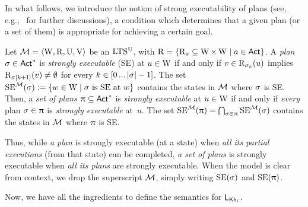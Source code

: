 \medskip

In what follows, we introduce the notion of strong executability of plans (see, e.g.,~\cite{Wang15lori,AFSVQ23report} for further discussions), a condition which determines that a given plan (or a set of them) is appropriate for achieving a certain goal.

\medskip


\begin{definition}\label{def:plans-exec}
Let $\mathcal{M}=\langle \operatorname{W}, \operatorname{R}, \operatorname{U}, \operatorname{V} \rangle$ be an $\textup{LTS$^\text{\textup{U}}$}$, with $\operatorname{R}=\{ \operatorname{R}_a\subseteq \operatorname{W} \times \operatorname{W} \mid a\in{\rm \sf Act} \}$. A \emph{plan} $\sigma \in {\rm \sf Act}^*$ is \emph{strongly executable} (SE) at $u \in \operatorname{W}$ if and only if $v \in \operatorname{R}_{\sigma_k}(u)$ implies $\operatorname{R}_{\sigma[k+1]}(v) \neq \emptyset$ for every $k \in [0 \mathop{...} |{\sigma}|-1]$.
The set $\operatorname{SE}^{\mathcal{M}}(\sigma):= \{ w\in\operatorname{W} \mid \sigma \mbox{ is SE at }w \}$ contains the states in $\mathcal{M}$ where $\sigma$ is SE. Then, a \emph{set of plans} $\uppi \subseteq {\rm \sf Act}^*$ is \emph{strongly executable} at $u \in \operatorname{W}$ if and only if \emph{every} plan $\sigma \in \uppi$ is \emph{strongly executable} at~$u$.
The set $\operatorname{SE}^{\mathcal{M}}(\uppi) = \bigcap_{\sigma \in \uppi} \operatorname{SE}^{\mathcal{M}}(\sigma)$ contains the states in $\mathcal{M}$ where $\uppi$ is SE.
\end{definition}
\medskip


Thus, while \emph{a plan} is strongly executable (at a state) when \emph{all its partial executions} (from that state) %
can be completed, \emph{a set of plans} is strongly executable when \emph{all its plans} are strongly executable. When the model is clear from context, we drop the superscript $\mathcal{M}$, simply writing $\operatorname{SE}(\sigma)$ and $\operatorname{SE}(\uppi)$.


Now, we have all the ingredients to define the semantics for $\mathsf{L}_{{\sf Kh}_i}$.
\medskip

